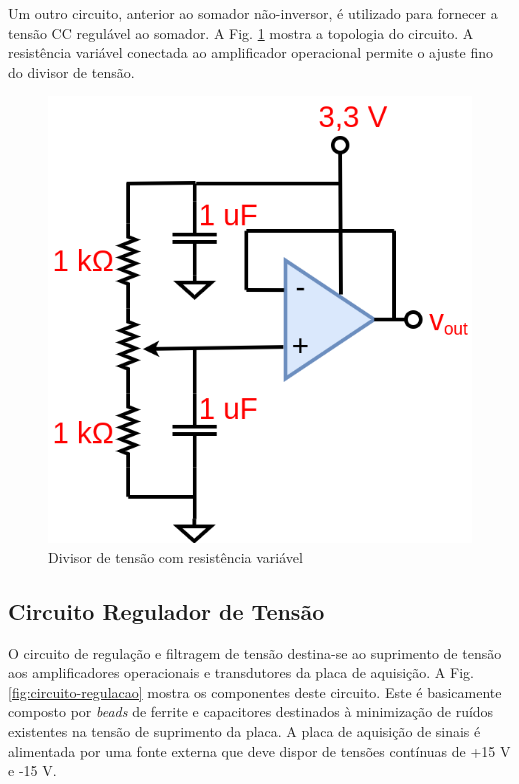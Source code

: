 Um outro circuito, anterior ao somador não-inversor, é utilizado para fornecer a tensão CC regulável ao somador.
A Fig. \ref{fig:divisor-tensao} mostra a topologia do circuito. A resistência variável conectada ao amplificador operacional permite o ajuste fino do divisor de tensão.

\begin{figure}[!hbt]
	\begin{center}
		\includegraphics[scale=0.25]{figuras/divisor-tensao.png}
		\caption{Divisor de tensão com resistência variável}
		\label{fig:divisor-tensao}
	\end{center}
\end{figure}

\subsection{Circuito Regulador de Tensão}

O circuito de regulação e filtragem de tensão destina-se ao suprimento de tensão aos amplificadores operacionais e transdutores da placa de aquisição. A Fig. \ref{fig:circuito-regulacao} mostra os componentes deste circuito. Este é basicamente composto por \textit{beads} de ferrite e capacitores destinados à minimização de ruídos existentes na tensão de suprimento da placa. A placa de aquisição de sinais é alimentada por uma fonte externa que deve dispor de tensões contínuas de +15 V e -15 V.

